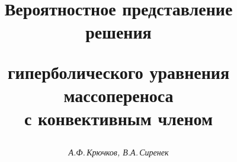 

 




 


\newcommand{\const}{\operatorname{const}} 


\newcommand{\tts}[1]{} 


 




 


\setcounter{page}{77} 












 


\author{\it А.Ф.\,Крючков, В.А.\,Сиренек} 




\title{Вероятностное представление решения  


гиперболического уравнения массопереноса\\


с конвективным членом} 


 


\date{} 




\pagestyle{plain} %


 




